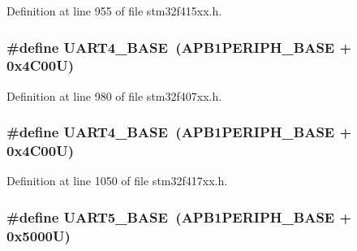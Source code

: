 Definition at line 955 of file stm32f415xx.\+h.

\subsubsection[{\texorpdfstring{U\+A\+R\+T4\+\_\+\+B\+A\+SE}{UART4_BASE}}]{\setlength{\rightskip}{0pt plus 5cm}\#define U\+A\+R\+T4\+\_\+\+B\+A\+SE~({\bf A\+P\+B1\+P\+E\+R\+I\+P\+H\+\_\+\+B\+A\+SE} + 0x4\+C00\+U)}\hypertarget{group___peripheral__registers__structures_ga94d92270bf587ccdc3a37a5bb5d20467}{}\label{group___peripheral__registers__structures_ga94d92270bf587ccdc3a37a5bb5d20467}


Definition at line 980 of file stm32f407xx.\+h.

\subsubsection[{\texorpdfstring{U\+A\+R\+T4\+\_\+\+B\+A\+SE}{UART4_BASE}}]{\setlength{\rightskip}{0pt plus 5cm}\#define U\+A\+R\+T4\+\_\+\+B\+A\+SE~({\bf A\+P\+B1\+P\+E\+R\+I\+P\+H\+\_\+\+B\+A\+SE} + 0x4\+C00\+U)}\hypertarget{group___peripheral__registers__structures_ga94d92270bf587ccdc3a37a5bb5d20467}{}\label{group___peripheral__registers__structures_ga94d92270bf587ccdc3a37a5bb5d20467}


Definition at line 1050 of file stm32f417xx.\+h.

\subsubsection[{\texorpdfstring{U\+A\+R\+T5\+\_\+\+B\+A\+SE}{UART5_BASE}}]{\setlength{\rightskip}{0pt plus 5cm}\#define U\+A\+R\+T5\+\_\+\+B\+A\+SE~({\bf A\+P\+B1\+P\+E\+R\+I\+P\+H\+\_\+\+B\+A\+SE} + 0x5000\+U)}\hypertarget{group___peripheral__registers__structures_gaa155689c0e206e6994951dc3cf31052a}{}\label{group___peripheral__registers__structures_gaa155689c0e206e6994951dc3cf31052a}



